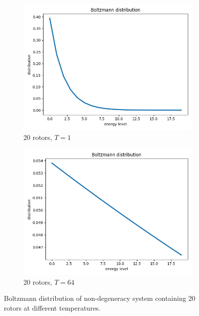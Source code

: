 \documentclass{assignmeownt}
\begin{document}
\begin{figure}
  \centering
  \begin{subfigure}[b]{0.4\textwidth}
      \centering
      \includegraphics[width=\linewidth]{../block1/2-BoltzmannDistribution/Results/non-degeneracy/20_1.png}
      \caption{20 rotors, $T=1$}
  \end{subfigure}
  \begin{subfigure}[b]{0.4\textwidth}
      \centering
      \includegraphics[width=\linewidth]{../block1/2-BoltzmannDistribution/Results/non-degeneracy/20_64.png}
      \caption{20 rotors, $T=64$}
  \end{subfigure}
     \caption{Boltzmann distribution of non-degeneracy system containing 20 rotors at different temperatures.}
     \label{fig:boltzmann_rotor}
\end{figure}
\end{document}
